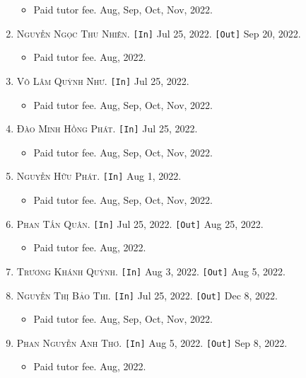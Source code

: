 \documentclass{article}
\numberwithin{equation}{section}
\begin{document}
\begin{enumerate}
	\begin{itemize}
		\item \textsf{Paid tutor fee.} Aug, Sep, Oct, Nov, 2022.
	\end{itemize}
	\item \textsc{Nguyễn Ngọc Thu Nhiên.} \texttt{[In]} Jul 25, 2022. \texttt{[Out]} Sep 20, 2022.
	\begin{itemize}
		\item \textsf{Paid tutor fee.} Aug, 2022.
	\end{itemize}
	\item \textsc{Võ Lâm Quỳnh Như.} \texttt{[In]} Jul 25, 2022.
	\begin{itemize}
		\item \textsf{Paid tutor fee.} Aug, Sep, Oct, Nov, 2022.
	\end{itemize}
	\item \textsc{Đào Minh Hồng Phát.} \texttt{[In]} Jul 25, 2022.
	\begin{itemize}
		\item \textsf{Paid tutor fee.} Aug, Sep, Oct, Nov, 2022.
	\end{itemize}
	\item \textsc{Nguyễn Hữu Phát.} \texttt{[In]} Aug 1, 2022.
	\begin{itemize}
		\item \textsf{Paid tutor fee.} Aug, Sep, Oct, Nov, 2022.
	\end{itemize}
	\item \textsc{Phan Tấn Quân.} \texttt{[In]} Jul 25, 2022. \texttt{[Out]} Aug 25, 2022.
	\begin{itemize}
		\item \textsf{Paid tutor fee.} Aug, 2022.
	\end{itemize}
	\item \textsc{Trương Khánh Quỳnh.} \texttt{[In]} Aug 3, 2022. \texttt{[Out]} Aug 5, 2022.
	\item \textsc{Nguyễn Thị Bảo Thi.} \texttt{[In]} Jul 25, 2022. \texttt{[Out]} Dec 8, 2022.
	\begin{itemize}
		\item \textsf{Paid tutor fee.} Aug, Sep, Oct, Nov, 2022.
	\end{itemize}
	\item \textsc{Phan Nguyễn Anh Thơ.} \texttt{[In]} Aug 5, 2022. \texttt{[Out]} Sep 8, 2022.
	\begin{itemize}
		\item \textsf{Paid tutor fee.} Aug, 2022.
	\end{itemize}

\end{enumerate}
\end{document}
